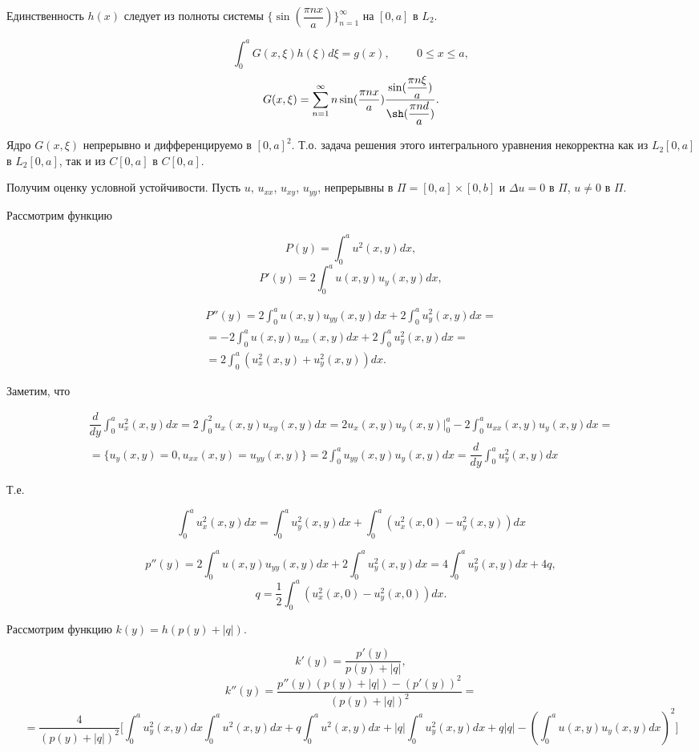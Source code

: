 \documentclass{article}
\begin{document}
Единственность $h(x)$ следует из полноты системы $\{\sin (\dfrac{\pi n x}{a})\}_{n=1}^{\infty}$ на $[0,a]$ в $L_2$.


\[
\int_0^a G(x,\xi) h(\xi) d \xi = g(x), \hspace{1cm} 0 \leqslant x \leqslant a,
\]
\[
G(x,\xi) =  \sum_{n=1}^{\infty} n \sin (\dfrac{\pi n x}{a})  \dfrac{\sin (\dfrac{\pi n \xi}{a})}{\sh (\dfrac{\pi n d}{a})}.
\]

Ядро $G(x,\xi)$ непрерывно и дифференцируемо в $[0,a]^2$. Т.о. задача решения этого интегрального уравнения некорректна как из $L_2[0,a]$ в $L_2[0,a]$, так и из $C[0,a]$ в $C[0,a]$.

Получим оценку условной устойчивости. Пусть $u$, $u_{xx}$, $u_{xy}$, $u_{yy}$, непрерывны в $\Pi = [0,a] \times [0,b]$ и $\Delta u = 0$ в $\Pi$, $u \ne 0$ в $\Pi$.

Рассмотрим функцию

\[
P(y) = \int_0^a u^2 (x,y) dx,
\]
\[
P'(y) = 2 \int_0^a u (x,y) u_y(x,y) dx,
\]

\begin{multline*}
P''(y) = 2 \int_0^a u (x,y) u_{yy}(x,y) dx + 2 \int_0^a u_y^2 (x,y) dx = \\
= -2 \int_0^a u (x,y) u_{xx}(x,y)dx + 2 \int_0^a u_y^2(x,y)dx = \\
=  2 \int_0^a (u_x^2(x,y) + u_y^2(x,y))dx.
\end{multline*}

Заметим, что

\begin{multline*}
\dfrac{d}{dy} \int_0^a u_x^2(x,y)dx =
 2 \int_0^2 u_x(x,y) u_{xy}(x,y) dx = 
 2 u_x(x,y) u_y(x,y) \bigg|_0^a - 2 \int_0^a u_{xx}(x,y) u_y(x,y) dx =\\
= \bigg\{ u_y(x,y) = 0, u_{xx}(x,y) = u_{yy}(x,y) \bigg\} =
 2 \int_0^a u_{yy}(x,y) u_y(x,y) dx = \dfrac{d}{dy} \int_0^a u_y^2(x,y)dx
\end{multline*}

Т.е.

\[
\int_0^a u_x^2(x,y)dx = \int_0^a u_y^2(x,y) dx + \int_0^a (u_x^2(x,0) - u_y^2(x,y)) dx
\]

\[
p''(y) = 2 \int_0^a u(x,y) u_{yy}(x,y)dx + 2 \int_0^a u_y^2(x,y) dx = 4 \int_0^a u_y^2(x,y) dx + 4q,
\]
\[
q = \dfrac{1}{2} \int_0^a (u_x^2(x,0) - u_y^2(x,0))dx.
\]

Рассмотрим функцию $k(y) = h(p(y) + |q|)$.

\[
k'(y) = \dfrac{p'(y)}{p(y) + |q|}, 
\]
\[
k''(y) = \dfrac{p''(y) (p(y) + |q|) - (p'(y))^2}{(p(y) + |q|)^2} = 
\]
\[
=\dfrac{4}{(p(y) + |q|)^2} \bigg[ \int_0^a u_y^2(x,y) dx \int_0^a u^2(x,y)dx + q \int_0^a u^2(x,y) dx + |q| \int_0^a u_y^2(x,y)dx + q |q| - (\int_0^a u(x,y) u _y(x,y)dx)^2 \bigg]
\]
\end{document}
